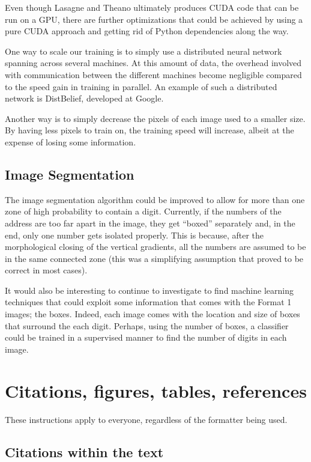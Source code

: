 \documentclass{article} %
\begin{document}
Even though Lasagne and Theano ultimately produces CUDA code that can be run on a GPU, there are further optimizations that could be achieved by using a pure CUDA approach and getting rid of Python dependencies along the way. 

One way to scale our training is to simply use a distributed neural network spanning across several machines. At this amount of data, the overhead involved with communication between the different machines become negligible compared to the speed gain in training in parallel. An example of such a distributed network is DistBelief, developed at Google.

Another way is to simply decrease the pixels of each image used to a smaller size. By having less pixels to train on, the training speed will increase, albeit at the expense of losing some information.

\subsection{Image Segmentation}
The image segmentation algorithm could be improved to allow for more than one zone of high probability to contain a digit. Currently, if the numbers of the address are too far apart in the image, they get “boxed” separately and, in the end, only one number gets isolated properly. This is because, after the morphological closing of the vertical gradients, all the numbers are assumed to be in the same connected zone (this was a simplifying assumption that proved to be correct in most cases).

It would also be interesting to continue to investigate to find machine learning techniques that could exploit some information that comes with the Format 1 images; the boxes. Indeed, each image comes with the location and size of boxes that surround the each digit. Perhaps, using the number of boxes, a classifier could be trained in a supervised manner to find the number of digits in each image. 



\section{Citations, figures, tables, references}
\label{others}

These instructions apply to everyone, regardless of the formatter being used.

\subsection{Citations within the text}
\end{document}
